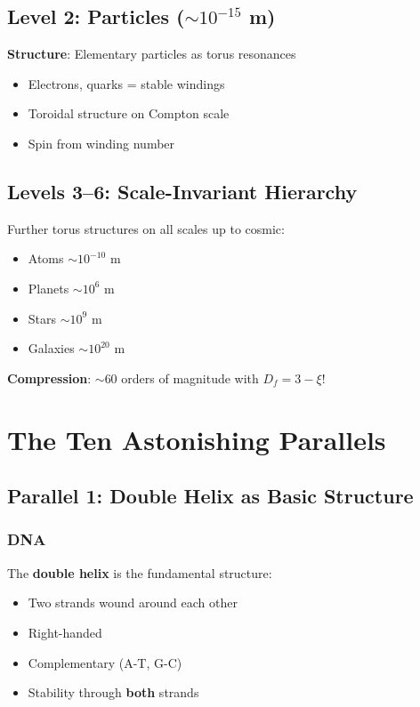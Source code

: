 	\subsection{Level 2: Particles ($\sim 10^{-15}$ m)}
	
	\textbf{Structure}: Elementary particles as torus resonances
	\begin{itemize}
		\item Electrons, quarks = stable windings
		\item Toroidal structure on Compton scale
		\item Spin from winding number
	\end{itemize}
	
	\subsection{Levels 3--6: Scale-Invariant Hierarchy}
	
	Further torus structures on all scales up to cosmic:
	\begin{itemize}
		\item Atoms $\sim 10^{-10}$ m
		\item Planets $\sim 10^{6}$ m  
		\item Stars $\sim 10^{9}$ m
		\item Galaxies $\sim 10^{20}$ m
	\end{itemize}
	
	\textbf{Compression}: $\sim 60$ orders of magnitude with $D_f = 3-\xi$!
	
	\section{The Ten Astonishing Parallels}
	
	\subsection{Parallel 1: Double Helix as Basic Structure}
	
	\subsubsection{DNA}
	
	The \textbf{double helix} is the fundamental structure:
	\begin{itemize}
		\item Two strands wound around each other
		\item Right-handed
		\item Complementary (A-T, G-C)
		\item Stability through \textbf{both} strands
	\end{itemize}
	
